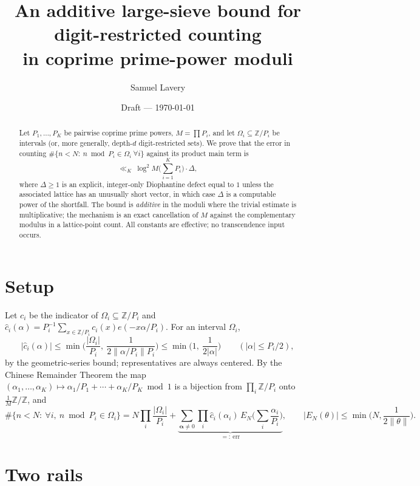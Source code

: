 \documentclass[11pt]{article}
\title{An additive large-sieve bound for digit-restricted counting\\
in coprime prime-power moduli}
\author{Samuel Lavery}
\date{Draft --- \today}
\newcommand{\nrm}[1]{\lVert #1\rVert}
\begin{document}
\maketitle

\begin{abstract}
Let $P_1,\dots,P_K$ be pairwise coprime prime powers, $M=\prod P_i$, and let
$\Omega_i\subseteq\mathbb Z/P_i$ be intervals (or, more generally, depth-$d$
digit-restricted sets).  We prove that the error in counting
$\#\{n<N:\ n\bmod P_i\in\Omega_i\ \forall i\}$ against its product main term is
\[
\ll_K\ \log^2M\Big(\sum_{i=1}^KP_i\Big)\cdot\Delta,
\]
where $\Delta\ge1$ is an explicit, integer-only Diophantine defect equal to $1$
unless the associated lattice has an unusually short vector, in which case
$\Delta$ is a computable power of the shortfall.  The bound is \emph{additive}
in the moduli where the trivial estimate is multiplicative; the mechanism is an
exact cancellation of $M$ against the complementary modulus in a lattice-point
count.  All constants are effective; no transcendence input occurs.
\end{abstract}

\section{Setup}

Let $c_i$ be the indicator of $\Omega_i\subseteq\mathbb Z/P_i$ and
$\hat c_i(\alpha)=P_i^{-1}\sum_{x\in\mathbb Z/P_i}c_i(x)e(-x\alpha/P_i)$.  For
an interval $\Omega_i$,
\begin{equation}\label{eq:kernel}
|\hat c_i(\alpha)|\le\min\Big(\frac{|\Omega_i|}{P_i},\ \frac{1}{2\nrm{\alpha/P_i}P_i}\Big)
\le\min\Big(1,\ \frac{1}{2|\alpha|}\Big)\qquad(|\alpha|\le P_i/2),
\end{equation}
by the geometric-series bound; representatives are always centered.
By the Chinese Remainder Theorem the map $(\alpha_1,\dots,\alpha_K)\mapsto
\alpha_1/P_1+\cdots+\alpha_K/P_K \bmod 1$ is a bijection from
$\prod_i\mathbb Z/P_i$ onto $\frac1M\mathbb Z/\mathbb Z$, and
\begin{equation}\label{eq:exact}
\#\{n<N:\ \forall i,\ n\bmod P_i\in\Omega_i\}
=N\prod_i\frac{|\Omega_i|}{P_i}
+\underbrace{\sum_{\boldsymbol\alpha\ne0}\prod_i\hat c_i(\alpha_i)\,
E_N\!\Big(\sum_i\frac{\alpha_i}{P_i}\Big)}_{=:\ \mathrm{err}},
\qquad |E_N(\theta)|\le\min\Big(N,\frac{1}{2\nrm\theta}\Big).
\end{equation}

\section{Two rails}
\end{document}
